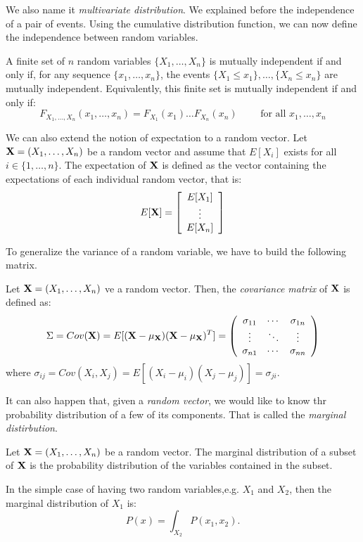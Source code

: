 We also name it \emph{multivariate distribution}.  We explained before the independence of a pair of events. Using the cumulative distribution function, we can now define the independence between random variables.
\begin{ndef}
A finite set of $n$ random variables $\{X_1,\dots,X_n\}$ is mutually independent if and only if, for any sequence $\{x_1,\dots,x_n\}$, the events $\{X_1 \leq x_1\}, \dots, \{X_n \leq x_n\}$ are mutually independent. 
Equivalently, this finite set is mutually independent if and only if:
$$
F_{X_1,\dots, X_n}(x_1,\dots,x_n) = F_{X_1}(x_1) \dots F_{X_n}(x_n) \quad \quad \text{ for all } x_1,\dots,x_n
$$
\end{ndef}


We can also extend the notion of expectation to a random vector. Let $\mathbf{X} = (X_1,\dots,X_n)$ be a random vector and assume that $E[X_i]$ exists for all $i \in \{1, \dots, n \}$. The expectation of $\mathbf{X}$ is defined as the vector containing the expectations of each individual random vector, that is:
$$
E[\mathbf{X}] = \left[ \begin{array}{c} 
E[X_1]\\
\vdots\\
E[X_n]
\end{array} \right]
$$

To generalize the variance of a random variable, we have to build the following matrix.

\begin{ndef}
Let $\mathbf{X} = (X_1,\dots,X_n)$ ve a random vector. Then, the \emph{covariance matrix} of $\mathbf{X}$ is defined as:
$$
\Sigma = Cov(\mathbf{X}) = E[(\mathbf{X} - \mu_{\mathbf{X}})(\mathbf{X} - \mu_{\mathbf{X}})^T] = \left ( \begin{array}{ccc} 
  \sigma_{11} & \cdots & \sigma_{1n}\\
  \vdots & \ddots & \vdots \\
  \sigma_{n1} & \cdots & \sigma_{nn}
  \end{array} \right )
$$
where $\sigma_{ij} = Cov(X_i,X_j) = E[(X_i - \mu_i)(X_j - \mu_j)] = \sigma_{ji}$.
\end{ndef}


It can also happen that, given a \emph{random vector}, we would like to know thr probability distribution of a few of its components. That is called the \emph{marginal distirbution}.

\begin{ndef}
Let $\mathbf{X} = (X_1,\dots,X_n)$ be a random vector. The marginal distribution of a subset of $\mathbf{X}$ is the probability distribution of the variables contained in the subset. 
\end{ndef}
In the simple case of having two random variables,e.g. $X_1$ and $X_2$, then the marginal distribution of $X_1$ is:
$$
P(x) = \int_{X_2} P(x_1,x_2).
$$

